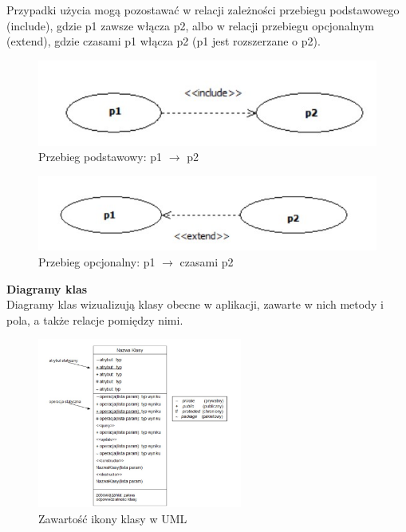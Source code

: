 \documentclass[a4paper,12pt,oneside]{book}
\begin{document}
                Przypadki użycia mogą pozostawać w relacji zależności przebiegu podstawowego (include), gdzie p1 zawsze włącza p2, albo w relacji przebiegu opcjonalnym (extend), gdzie czasami p1 włącza p2 (p1 jest rozszerzane o p2).
                \begin{figure}[h]
                    \centering
                    \includegraphics[width=\textwidth/3]{images/uc_include.jpg}
                    \caption{Przebieg podstawowy: p1 \(\rightarrow\) p2}
                    \label{fig:twojastara32}
                \end{figure}
                \begin{figure}[h]
                    \centering
                    \includegraphics[width=\textwidth/3]{images/uc_extend.jpg}
                    \caption{Przebieg opcjonalny: p1 \(\rightarrow\) czasami p2}
                    \label{fig:twojastara33}
                \end{figure}
				\textbf{Diagramy klas}\\
                Diagramy klas wizualizują klasy obecne w aplikacji, zawarte w nich metody i pola, a także relacje pomiędzy nimi.\\
                \begin{figure}[h]
                    \centering
                    \includegraphics[width=0.6\textwidth]{images/class_diagram.jpg}
                    \caption{Zawartość ikony klasy w UML}
                    \label{fig:twojastara34}
                \end{figure}
\end{document}
